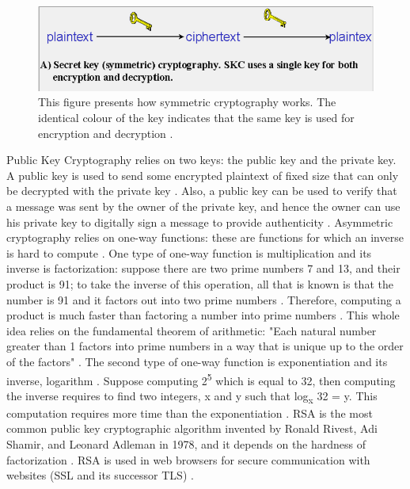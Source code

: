 \documentclass{l4proj}
\begin{document}
\begin{figure}[]
    \centering
    \includegraphics[width=\textwidth]{images/SymEnc.PNG}
    \caption{This figure presents how symmetric cryptography works.
     The identical colour of the key indicates that the same key is used for encryption and decryption 
     \citep{kessler_overview_2016}.}
    \label{fig:sym}
\end{figure}

Public Key Cryptography relies on two keys: the public key and the private key. 
A public key is used to send some encrypted plaintext of fixed size that can only be decrypted with the private key \citep{savage_cse_2019}. 
Also, a public key can be used to verify that a message was sent by the owner of the private key, 
and hence the owner can use his private key to digitally sign a message to provide authenticity \citep{savage_cse_2019}.
Asymmetric cryptography relies on one-way functions: these are functions for which an inverse is hard to compute \citep{kessler_overview_2016}.
One type of one-way function is multiplication and its inverse is factorization: suppose there are two prime numbers 7 and 13, and their product is 91; 
to take the inverse of this operation, all that is known is that the number is 91 and it factors out into two prime numbers \citep{kessler_overview_2016}.
Therefore, computing a product is much faster than factoring a number into prime numbers \citep{kessler_overview_2016}. 
This whole idea relies on the fundamental theorem of arithmetic: 
"Each natural number greater than 1 factors into prime numbers in a way that is unique up to the order of the factors" \citep{anderson_security_2008}.
The second type of one-way function is exponentiation and its inverse, logarithm \citep{kessler_overview_2016}. Suppose computing 2\textsuperscript{5} which is equal
to 32, then computing the inverse requires to find two integers, x and y such that log\textsubscript{x} 32 = y. This computation requires more time than the exponentiation \citep{kessler_overview_2016}.
RSA is the most common public key cryptographic algorithm invented by Ronald Rivest, Adi Shamir, and Leonard Adleman in 1978, 
and it depends on the hardness of factorization \citep{kessler_overview_2016} \citep{savage_cse_2019}.
RSA is used in web browsers for secure communication with websites (SSL and its successor TLS) \citep{anderson_security_2008}.
\end{document}
